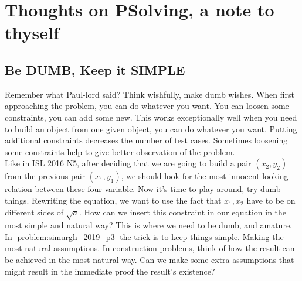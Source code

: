 \chapter{Thoughts on PSolving, a note to thyself}
\thispagestyle{empty}
	\section{Be DUMB, Keep it SIMPLE} 
	
	Remember what Paul-lord said? Think wishfully, make dumb wishes. When first approaching the problem, you can do whatever you want. You can loosen some constraints, you can add some new. This works exceptionally well when you need to build an object from one given object, you can do whatever you want. Putting additional constraints decreases the number of test cases. Sometimes loosening some constraints help to give better observation of the problem. \\
	
	
	Like in ISL 2016 N5, after deciding that we are going to build a pair $ (x_2, y_2) $ from the previous pair $ (x_1, y_1) $, we should look for the most innocent looking relation between these four variable. Now it's time to play around, try dumb things. Rewriting the equation, we want to use the fact that $ x_1, x_2 $ have to be on different sides of $ \sqrt{a} $. How can we insert this constraint in our equation in the most simple and natural way? This is where we need to be dumb, and amature.\\
	
	
	In \autoref{problem:simurgh_2019_p3} the trick is to keep things simple. Making the most natural assumptions. In construction problems, think of how the result can be achieved in the most natural way. Can we make some extra assumptions that might result in the immediate proof the result's existence? 